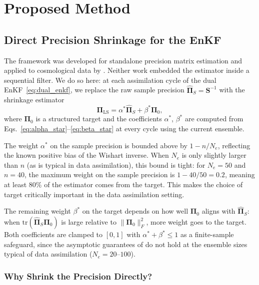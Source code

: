 \chapter{Proposed Method}
\label{ch:proposed_method}

\section{Direct Precision Shrinkage for the EnKF}
\label{sec:dps_enkf}

The \citep{bodnar2016direct} framework was developed for standalone precision matrix estimation and applied to cosmological data by \citep{looijmans2024comparison}. Neither work embedded the estimator inside a sequential filter. We do so here: at each assimilation cycle of the dual EnKF~\eqref{eq:dual_enkf}, we replace the raw sample precision $\hat{\boldsymbol{\Pi}}_S = \mathbf{S}^{-1}$ with the shrinkage estimator
\begin{equation}
\label{eq:direct_precision_method}
\boldsymbol{\Pi}_{\text{LS}} = \alpha^* \hat{\boldsymbol{\Pi}}_S + \beta^* \boldsymbol{\Pi}_0,
\end{equation}
where $\boldsymbol{\Pi}_0$ is a structured target and the coefficients $\alpha^*$, $\beta^*$ are computed from Eqs.~\eqref{eq:alpha_star}--\eqref{eq:beta_star} at every cycle using the current ensemble.

The weight $\alpha^*$ on the sample precision is bounded above by $1 - n/N_e$, reflecting the known positive bias of the Wishart inverse. When $N_e$ is only slightly larger than $n$ (as is typical in data assimilation), this bound is tight: for $N_e = 50$ and $n = 40$, the maximum weight on the sample precision is $1 - 40/50 = 0.2$, meaning at least $80\%$ of the estimator comes from the target. This makes the choice of target critically important in the data assimilation setting.

The remaining weight $\beta^*$ on the target depends on how well $\boldsymbol{\Pi}_0$ aligns with $\hat{\boldsymbol{\Pi}}_S$: when $\text{tr}(\hat{\boldsymbol{\Pi}}_S \boldsymbol{\Pi}_0)$ is large relative to $\|\boldsymbol{\Pi}_0\|_F^2$, more weight goes to the target. Both coefficients are clamped to $[0, 1]$ with $\alpha^* + \beta^* \leq 1$ as a finite-sample safeguard, since the asymptotic guarantees of \citep{bodnar2016direct} do not hold at the ensemble sizes typical of data assimilation ($N_e = 20$--$100$).

\subsection{Why Shrink the Precision Directly?}
\label{sec:why_direct}

